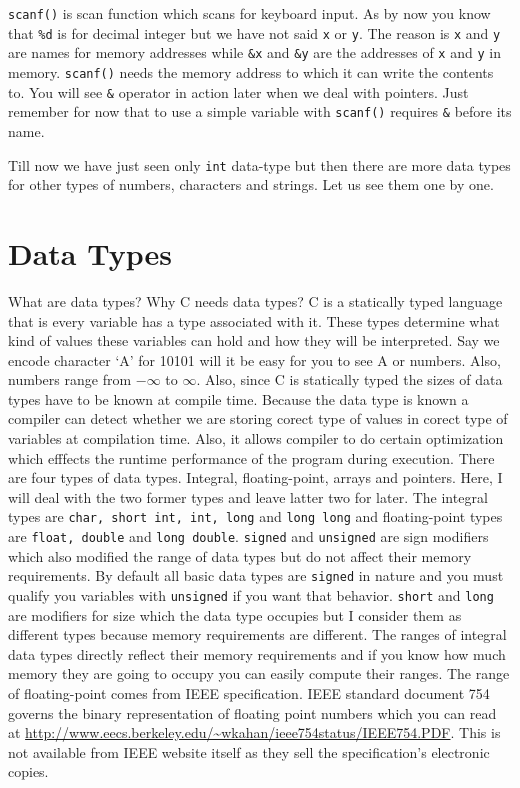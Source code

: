 \texttt{scanf()} is scan function which scans for keyboard input. As by now you
know that \texttt{\%d} is for decimal integer but we have not said \texttt{x}
or \texttt{y}. The reason is \texttt{x} and \texttt{y} are names for memory
addresses while
\texttt{\&x} and \texttt{\&y} are the addresses of \texttt{x} and \texttt{y} in
memory. \texttt{scanf()} needs the memory address to which it can write the
contents to. You will see \texttt{\&} operator in action later when we deal
with pointers. Just remember for now that to use a simple variable with
\texttt{scanf()} requires \texttt{\&} before its name.

Till now we have just seen only \texttt{int} data-type but then there are more
data types for other types of numbers, characters and strings. Let us see them
one by one.

\section{Data Types}
What are data types? Why C needs data types? C is a statically typed language
that is every variable has a type associated with it. These types determine
what kind of values these variables can hold and how they will be interpreted.
Say we encode
character `A' for 10101 will it be easy for you to see A or numbers. Also,
numbers range from $-\infty$ to $\infty$. Also, since C is statically typed the
sizes of data types have to be known at compile time. Because the data type is
known a compiler can detect whether we are storing corect type of values in
corect type of variables at compilation time. Also, it allows compiler to do
certain optimization which efffects the runtime performance of the program
during execution. There are four types of
data types. Integral, floating-point, arrays and pointers. Here, I will deal
with the two former types and leave latter two for later. The integral types
are \texttt{char, short int, int, long} and \texttt{long long} and
floating-point types are \texttt{float, double} and \texttt{long
  double}. \texttt{signed} and \texttt{unsigned} are sign modifiers which also
modified the range of data types but do not affect their memory
requirements. By default all basic data types are \texttt{signed} in nature and
you must qualify you variables with \texttt{unsigned} if you want that
behavior. \texttt{short} and \texttt{long} are modifiers for size which the
data type occupies but I consider them as different types because memory
requirements are different. The ranges of integral data types directly reflect
their memory requirements and if you know how much memory they are going to
occupy you can easily compute their ranges. The range of floating-point comes
from IEEE specification. IEEE standard document 754 governs the binary
representation of floating point numbers which you can read at
\url{http://www.eecs.berkeley.edu/~wkahan/ieee754status/IEEE754.PDF}. This is
not available from IEEE website itself as they sell the specification's
electronic copies.

